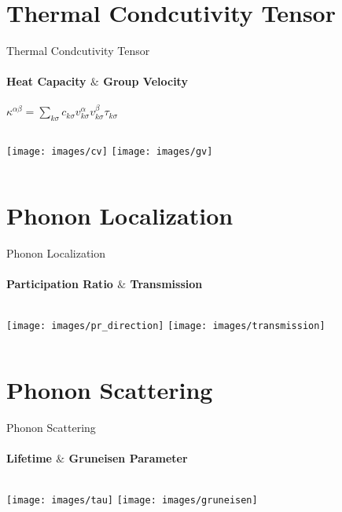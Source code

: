 \documentclass{beamer}
\begin{document}
\section{Thermal Condcutivity Tensor}
\begin{frame}{Thermal Condcutivity Tensor}
  \framesubtitle{Heat Capacity $\&$ Group Velocity}%
  $\kappa^{\alpha\beta} = \sum_{k \sigma}{c_{k \sigma}v^{\alpha}_{k \sigma}v^{\beta}_{k \sigma}\tau_{k \sigma}}$

  \begin{columns}[onlytextwidth]
    \texttt{[image: images/cv]}
    \texttt{[image: images/gv]}
  \end{columns}
\end{frame}

\section{Phonon Localization}
\begin{frame}{Phonon Localization}
  \framesubtitle{Participation Ratio $\&$ Transmission}%
  \begin{columns}[onlytextwidth]
    \texttt{[image: images/pr\_direction]}
    \texttt{[image: images/transmission]}
  \end{columns}
\end{frame}

\section{Phonon Scattering}
\begin{frame}{Phonon Scattering}
  \framesubtitle{Lifetime $\&$ Gruneisen Parameter}%
  \begin{columns}[onlytextwidth]
    \texttt{[image: images/tau]}
    \texttt{[image: images/gruneisen]}
  \end{columns}
\end{frame}
\end{document}
